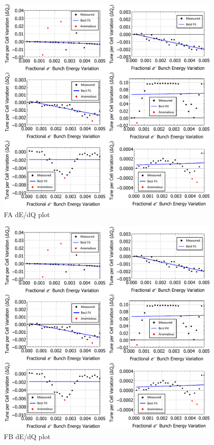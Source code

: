 \documentclass[../main.tex]{subfiles}
\begin{document}
\begin{figure}[!h]
\centering
\includegraphics[width=\textwidth]{Figures/CBETA_Multi-Pass_Commissioning/chromaticity/FA_analysed_3turn_dEedQ.pdf}
\caption{FA dE/dQ plot}
\label{fig:FA_dEdQ}
\end{figure}

\begin{figure}[!h]
\centering
\includegraphics[width=\textwidth]{Figures/CBETA_Multi-Pass_Commissioning/chromaticity/FB_analysed_3turn_dEedQ.pdf}
\caption{FB dE/dQ plot}
\label{fig:FB_dEdQ}
\end{figure}
\end{document}

